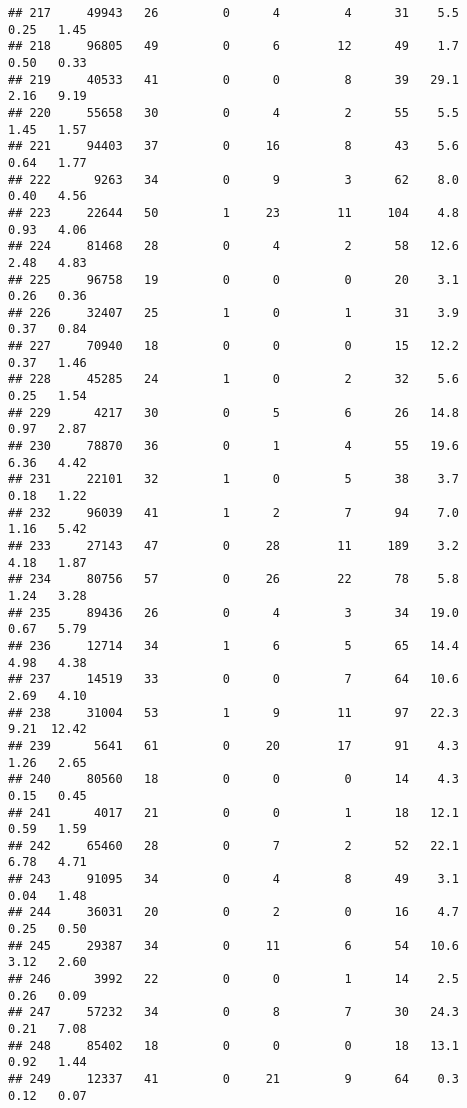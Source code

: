 \documentclass[
]{article}
\begin{document}
\begin{verbatim}
## 217     49943   26         0      4         4      31    5.5    0.25   1.45
## 218     96805   49         0      6        12      49    1.7    0.50   0.33
## 219     40533   41         0      0         8      39   29.1    2.16   9.19
## 220     55658   30         0      4         2      55    5.5    1.45   1.57
## 221     94403   37         0     16         8      43    5.6    0.64   1.77
## 222      9263   34         0      9         3      62    8.0    0.40   4.56
## 223     22644   50         1     23        11     104    4.8    0.93   4.06
## 224     81468   28         0      4         2      58   12.6    2.48   4.83
## 225     96758   19         0      0         0      20    3.1    0.26   0.36
## 226     32407   25         1      0         1      31    3.9    0.37   0.84
## 227     70940   18         0      0         0      15   12.2    0.37   1.46
## 228     45285   24         1      0         2      32    5.6    0.25   1.54
## 229      4217   30         0      5         6      26   14.8    0.97   2.87
## 230     78870   36         0      1         4      55   19.6    6.36   4.42
## 231     22101   32         1      0         5      38    3.7    0.18   1.22
## 232     96039   41         1      2         7      94    7.0    1.16   5.42
## 233     27143   47         0     28        11     189    3.2    4.18   1.87
## 234     80756   57         0     26        22      78    5.8    1.24   3.28
## 235     89436   26         0      4         3      34   19.0    0.67   5.79
## 236     12714   34         1      6         5      65   14.4    4.98   4.38
## 237     14519   33         0      0         7      64   10.6    2.69   4.10
## 238     31004   53         1      9        11      97   22.3    9.21  12.42
## 239      5641   61         0     20        17      91    4.3    1.26   2.65
## 240     80560   18         0      0         0      14    4.3    0.15   0.45
## 241      4017   21         0      0         1      18   12.1    0.59   1.59
## 242     65460   28         0      7         2      52   22.1    6.78   4.71
## 243     91095   34         0      4         8      49    3.1    0.04   1.48
## 244     36031   20         0      2         0      16    4.7    0.25   0.50
## 245     29387   34         0     11         6      54   10.6    3.12   2.60
## 246      3992   22         0      0         1      14    2.5    0.26   0.09
## 247     57232   34         0      8         7      30   24.3    0.21   7.08
## 248     85402   18         0      0         0      18   13.1    0.92   1.44
## 249     12337   41         0     21         9      64    0.3    0.12   0.07

\end{verbatim}
\end{document}
